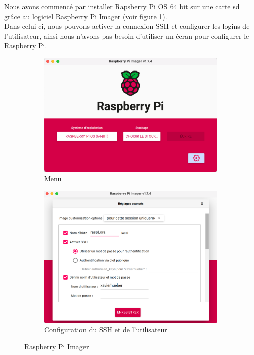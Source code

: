 \documentclass{article}
\begin{document}
				Nous avons commencé par installer Rapsberry Pi OS 64 bit sur une carte sd grâce au logiciel Raspberry Pi Imager (voir figure \ref{fig:raspberrypiimager}).\\
				Dans celui-ci, nous pouvons activer la connexion SSH et configurer les logins de l'utilisateur, ainsi nous n'avons pas besoin d'utiliser un écran pour configurer le Raspberry Pi.
				\begin{figure}[H]
					\centering
					\begin{subfigure}{0.49\textwidth}
						\centering
						\includegraphics[width=\linewidth]{raspberrypi_imager}
						\caption{Menu}
						\label{fig:raspberrypiimager}
					\end{subfigure}
					\begin{subfigure}{0.49\textwidth}
						\centering
						\includegraphics[width=\linewidth]{raspberrypi_imager1}
						\caption{Configuration du SSH et de l'utilisateur}
						\label{fig:raspberrypiimager1}
					\end{subfigure}
					\caption{Raspberry Pi Imager}
				\end{figure}
\end{document}
